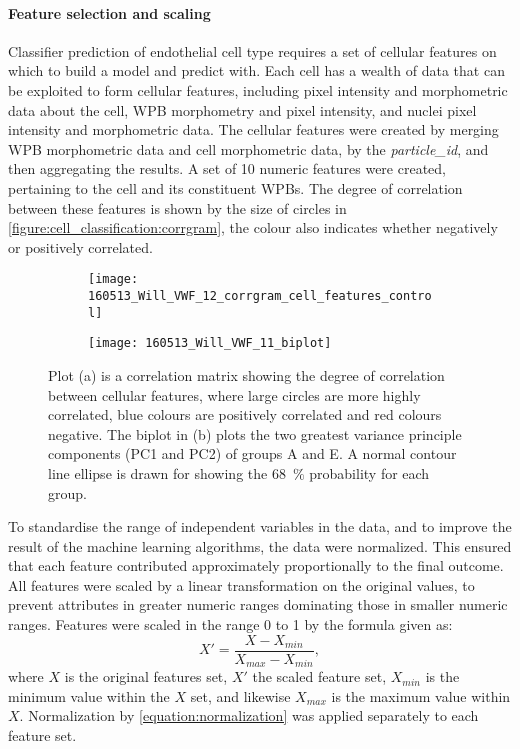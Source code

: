 \paragraph{Feature selection and scaling}
Classifier prediction of endothelial cell type requires a set of cellular features on which to build a model and predict with. Each cell has a wealth of data that can be exploited to form cellular features, including pixel intensity and morphometric data about the cell, WPB morphometry and pixel intensity, and nuclei pixel intensity and morphometric data. The cellular features were created by merging WPB morphometric data and cell morphometric data, by the \emph{particle\_id}, and then aggregating the results. A set of 10 numeric features were created, pertaining to the cell and its constituent WPBs. The degree of correlation between these features is shown by the size of circles in \autoref{figure:cell_classification:corrgram}, the colour also indicates whether negatively or positively correlated.

\begin{figure}[!htbp]
	\centering
	\begin{subfigure}[b]{0.73\linewidth}
		\texttt{[image: 160513\_Will\_VWF\_12\_corrgram\_cell\_features\_control]}
		\caption{}
		\label{figure:cell_classification:corrgram}
	\end{subfigure}
	\begin{subfigure}[b]{0.73\linewidth}
		\texttt{[image: 160513\_Will\_VWF\_11\_biplot]}
		\caption{}
		\label{figure:cell_classification:ggbiplot}
	\end{subfigure}
	\caption[Correlation matrix cellular features plot and biplot of PCA]{Plot (a) is a correlation matrix showing the degree of correlation between cellular features, where large circles are more highly correlated, blue colours are positively correlated and red colours negative. The biplot in (b) plots the two greatest variance principle components (PC1 and PC2) of groups A and E. A normal contour line ellipse is drawn for showing the 68~$\%$ probability for each group.}
	\label{figure:cell_classification:feature_selection_and_PCA}
\end{figure}

To standardise the range of independent variables in the data, and to improve the result of the machine learning algorithms, the data were normalized. This ensured that each feature contributed approximately proportionally to the final outcome. All features were scaled by a linear transformation on the original values, to prevent attributes in greater numeric ranges dominating those in smaller numeric ranges. Features were scaled in the range 0 to 1 by the formula given as:
\begin{equation}
	X' = \frac{X - X_{min}}{X_{max}-X_{min}}, 
	\label{equation:normalization}
\end{equation}
where $X$ is the original features set, $X'$ the scaled feature set, $X_{min}$ is the minimum value within the $X$ set, and likewise $X_{max}$ is the maximum value within $X$. Normalization by \autoref{equation:normalization} was applied separately to each feature set.

